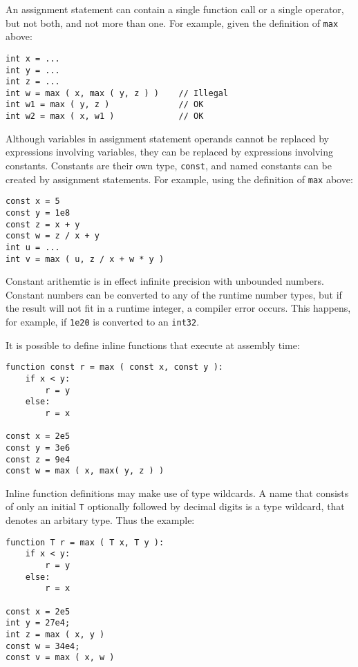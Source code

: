 \documentclass[12pt]{article}
\newenvironment{indpar}[1][0.3in]%
	{\begin{list}{}%
		     {\setlength{\itemsep}{0in}%
		      \setlength{\topsep}{0in}%
		      \setlength{\parsep}{1ex}%
		      \setlength{\labelwidth}{#1}%
		      \setlength{\leftmargin}{#1}%
		      \addtolength{\leftmargin}{\labelsep}}%
	 \item}%
	{\end{list}}
\begin{document}
An assignment statement can contain a single function call
or a single operator, but not both, and not more than one.
For example, given the definition of {\tt max} above:

\begin{indpar}\begin{verbatim}
int x = ...
int y = ...
int z = ...
int w = max ( x, max ( y, z ) )    // Illegal
int w1 = max ( y, z )              // OK
int w2 = max ( x, w1 )             // OK
\end{verbatim}\end{indpar}

Although variables in assignment statement operands cannot be
replaced by expressions involving variables, they can be replaced
by expressions involving constants.  Constants are their own
type, {\tt const}, and named constants can be created by assignment
statements.  For example, using the definition of {\tt max} above:

\begin{indpar}\begin{verbatim}
const x = 5
const y = 1e8
const z = x + y
const w = z / x + y
int u = ...
int v = max ( u, z / x + w * y )
\end{verbatim}\end{indpar}

Constant arithemtic is in effect infinite precision with unbounded
numbers.  Constant numbers can be converted to any of the runtime
number types, but if the result will not fit in a runtime integer,
a compiler error occurs.  This happens, for example, if {\tt 1e20}
is converted to an {\tt int32}.

It is possible to define inline functions that execute at assembly
time:

\begin{indpar}\begin{verbatim}
function const r = max ( const x, const y ):
    if x < y:
        r = y
    else:
        r = x

const x = 2e5
const y = 3e6
const z = 9e4
const w = max ( x, max( y, z ) )
\end{verbatim}\end{indpar}

Inline function definitions may make use of type wildcards.
A name that consists of only an initial {\tt T} optionally
followed by decimal digits is a type wildcard, that denotes
an arbitary type.  Thus the example:

\begin{indpar}\begin{verbatim}
function T r = max ( T x, T y ):
    if x < y:
        r = y
    else:
        r = x

const x = 2e5
int y = 27e4;
int z = max ( x, y )
const w = 34e4;
const v = max ( x, w )
\end{verbatim}\end{indpar}
\end{document}
